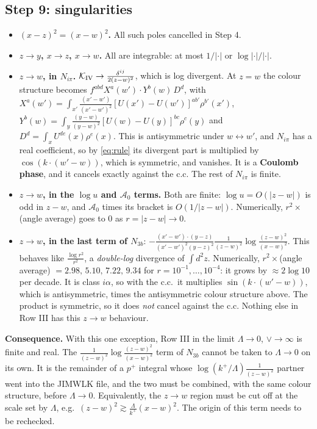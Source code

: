 \documentclass[10pt]{article}
\numberwithin{equation}{section}
\newcommand{\red}[1]{{\color{red}#1}}
\begin{document}
\subsection{Step 9: singularities}
\begin{itemize}
\item \textbf{$(x-z)^{2}=(x-w)^{2}$.} All such poles cancelled in Step 4.
\item \textbf{$z\to y$, $x\to z$, $x\to w$.} All are integrable: at most $1/|\cdot|$ or $\log|\cdot|/|\cdot|$.
\item \textbf{$z\to w$, in $N_{i\pi}$.} $\mathcal K_{\rm IV}\to\frac{\delta^{ij}}{2(z-w)^{2}}$, which is log divergent. At $z=w$ the colour structure becomes $f^{abd}X^{a}(w')\cdot Y^{b}(w)\,D^{d}$, with $X^{a}(w')=\int_{x'}\frac{(x'-w')}{(x'-w')^{2}}[U(x')-U(w')]^{ab'}\rho^{b'}(x')$, $Y^{b}(w)=\int_{y}\frac{(y-w)}{(y-w)^{2}}[U(w)-U(y)]^{bc}\rho^{c}(y)$ and $D^{d}=\int_{x}U^{de}(x)\rho^{e}(x)$. This is antisymmetric under $w\leftrightarrow w'$, and $N_{i\pi}$ has a real coefficient, so by \eqref{eq:rule} its divergent part is multiplied by $\cos(k\cdot(w'-w))$, which is symmetric, and vanishes. It is a \textbf{Coulomb phase}, and it cancels exactly against the c.c. The rest of $N_{i\pi}$ is finite.
\item \textbf{$z\to w$, in the $\log u$ and $\mathcal A_{0}$ terms.} Both are finite: $\log u=O(|z-w|)$ is odd in $z-w$, and $\mathcal A_{0}$ times its bracket is $O(1/|z-w|)$. Numerically, $r^{2}\times$(angle average) goes to $0$ as $r=|z-w|\to0$.
\item \red{\textbf{$z\to w$, in the last term of $N_{3b}$}: $-\frac{(x'-w')\cdot(y-z)}{(x'-w')^{2}(y-z)^{2}}\frac{1}{(z-w)^{2}}\log\frac{(z-w)^{2}}{(x-w)^{2}}$.} \red{This behaves like $\frac{\log r^{2}}{r^{2}}$, a \emph{double-log} divergence of $\int d^{2}z$. Numerically, $r^{2}\times$(angle average) $=2.98,\,5.10,\,7.22,\,9.34$ for $r=10^{-1},\dots,10^{-4}$: it grows by $\approx2\log10$ per decade. It is class $i\alpha$, so with the c.c.\ it multiplies $\sin(k\cdot(w'-w))$, which is antisymmetric, times the antisymmetric colour structure above. The product is symmetric, so it does \emph{not} cancel against the c.c. Nothing else in Row III has this $z\to w$ behaviour.}
\end{itemize}

\red{\textbf{Consequence.} With this one exception, Row III in the limit $\Lambda\to0$, $\vee\to\infty$ is finite and real. The $\frac{1}{(z-w)^{2}}\log\frac{(z-w)^{2}}{(x-w)^{2}}$ term of $N_{3b}$ cannot be taken to $\Lambda\to0$ on its own. It is the remainder of a $p^{+}$ integral whose $\log(k^{+}/\Lambda)\frac{1}{(z-w)^{2}}$ partner went into the JIMWLK file, and the two must be combined, with the same colour structure, before $\Lambda\to0$. Equivalently, the $z\to w$ region must be cut off at the scale set by $\Lambda$, e.g.\ $(z-w)^{2}\gtrsim\frac{\Lambda}{k^{+}}(x-w)^{2}$. The origin of this term needs to be rechecked.}
\end{document}
